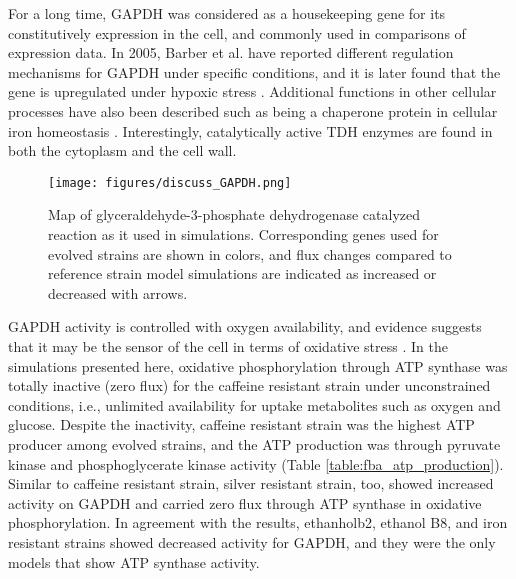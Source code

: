 For a long time, GAPDH was considered as a housekeeping gene for its constitutively expression in the cell, and commonly used in comparisons of expression data. In 2005, Barber et al. have reported different regulation mechanisms for GAPDH under specific conditions\cite{barber2005gapdh}, and it is later found that the gene is upregulated under hypoxic stress \cite{yang2008effects}. Additional functions in other cellular processes have also been described such as being a chaperone protein in cellular iron homeostasis \cite{sweeny2018glyceraldehyde}. Interestingly, catalytically active TDH enzymes are found in both the cytoplasm and the cell wall.

\begin{figure}[H]
\texttt{[image: figures/discuss\_GAPDH.png]}
\caption[Map of glyceraldehyde-3-phosphate dehydrogenase catalyzed reaction as it used in simulations]{Map of glyceraldehyde-3-phosphate dehydrogenase catalyzed reaction as it used in simulations. Corresponding genes used for evolved strains are shown in colors, and flux changes compared to reference strain model simulations are indicated as increased or decreased with arrows.}
\label{fig:discuss_GAPDH}
\end{figure}

GAPDH activity is controlled with oxygen availability, and evidence suggests that it may be the sensor of the cell in terms of oxidative stress \cite{chuang2005glyceraldehyde}. In the simulations presented here, oxidative phosphorylation through ATP synthase was totally inactive (zero flux) for the caffeine resistant strain under unconstrained conditions, i.e., unlimited availability for uptake metabolites such as oxygen and glucose. Despite the inactivity, caffeine resistant strain was the highest ATP producer among evolved strains, and the ATP production was through pyruvate kinase and phosphoglycerate kinase activity (Table \ref{table:fba_atp_production}). Similar to caffeine resistant strain, silver resistant strain, too, showed increased activity on GAPDH and carried zero flux through ATP synthase in oxidative phosphorylation. In agreement with the results, ethanholb2, ethanol B8, and iron resistant strains showed decreased activity for GAPDH, and they were the only models that show ATP synthase activity.

